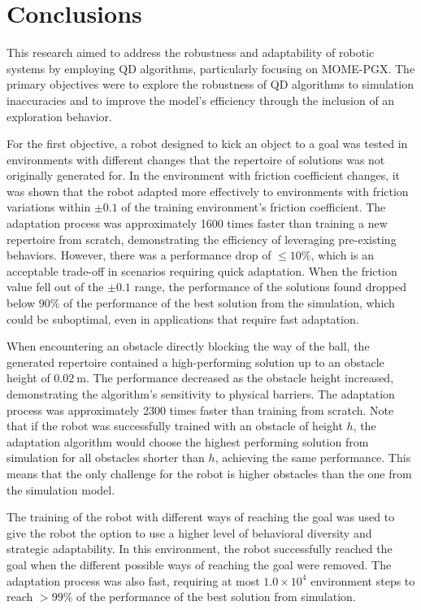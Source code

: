 \documentclass[12pt]{article}
\begin{document}

\section{Conclusions}

This research aimed to address the robustness and adaptability of robotic systems by employing QD algorithms, particularly focusing on MOME-PGX. The primary objectives were to explore the robustness of QD algorithms to simulation inaccuracies and to improve the model's efficiency through the inclusion of an exploration behavior.

For the first objective, a robot designed to kick an object to a goal was tested in environments with different changes that the repertoire of solutions was not originally generated for. In the environment with friction coefficient changes, it was shown that the robot adapted more effectively to environments with friction variations within $\pm 0.1$ of the training environment's friction coefficient. The adaptation process was approximately 1600 times faster than training a new repertoire from scratch, demonstrating the efficiency of leveraging pre-existing behaviors. However, there was a performance drop of  $\leq10\%$, which is an acceptable trade-off in scenarios requiring quick adaptation. When the friction value fell out of the $\pm 0.1$ range, the performance of the solutions found dropped below 90\% of the performance of the best solution from the simulation, which could be suboptimal, even in applications that require fast adaptation. 

When encountering an obstacle directly blocking the way of the ball, the generated repertoire contained a high-performing solution up to an obstacle height of $0.02\ \text{m}$. The performance decreased as the obstacle height increased, demonstrating the algorithm's sensitivity to physical barriers. The adaptation process was approximately 2300 times faster than training from scratch. Note that if the robot was successfully trained with an obstacle of height $h$, the adaptation algorithm would choose the highest performing solution from simulation for all obstacles shorter than $h$, achieving the same performance. This means that the only challenge for the robot is higher obstacles than the one from the simulation model.

The training of the robot with different ways of reaching the goal was used to give the robot the option to use a higher level of behavioral diversity and strategic adaptability. In this environment, the robot successfully reached the goal when the different possible ways of reaching the goal were removed. The adaptation process was also fast, requiring at most $1.0 \times 10^4$ environment steps to reach $>99\%$ of the performance of the best solution from simulation.
\end{document}
